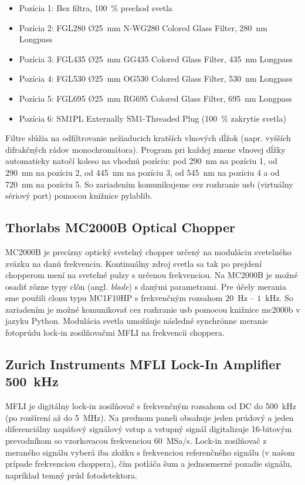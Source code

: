 \documentclass[12pt,a4paper]{article}
\begin{document}
\begin{itemize}
    \item Pozícia 1: Bez filtra, 100~\% prechod svetla
    \item Pozícia 2: FGL280 \O25~mm N-WG280 Colored Glass Filter, 280~nm Longpass
    \item Pozícia 3: FGL435 \O25~mm GG435 Colored Glass Filter, 435~nm Longpass
    \item Pozícia 4: FGL530 \O25~mm OG530 Colored Glass Filter, 530~nm Longpass
    \item Pozícia 5: FGL695 \O25~mm RG695 Colored Glass Filter, 695~nm Longpass
    \item Pozícia 6: SM1PL Externally SM1-Threaded Plug (100~\% zakrytie svetla)
\end{itemize}

Filtre slúžia na odfiltrovanie nežiaducich kratších vlnových dĺžok (napr. vyšších difrakčných rádov monochromátora). Program pri každej zmene vlnovej dĺžky automaticky natočí koleso na vhodnú pozíciu: pod 290~nm na pozíciu 1, od 290~nm na pozíciu 2, od 445~nm na pozíciu 3, od 545~nm na pozíciu 4 a od 720~nm na pozíciu 5. So zariadením komunikujeme cez rozhranie \ac{usb} (virtuálny sériový port) pomocou knižnice pylablib.

\newpage
\subsection{Thorlabs MC2000B Optical Chopper}
MC2000B je precízny optický svetelný chopper určený na moduláciu svetelného zväzku na danú frekvenciu. Kontinuálny zdroj svetla sa tak po prejdení chopperom mení na svetelné pulzy s určenou frekvenciou. Na MC2000B je možné osadiť rôzne typy clôn (angl. \textit{blade}) s danými parametrami. Pre účely merania sme použili clonu typu MC1F10HP s frekvenčným rozsahom $20$~Hz -- $1$~kHz. So zariadením je možné komunikovať cez rozhranie \ac{usb} pomocou knižnice mc2000b v jazyku Python. Modulácia svetla umožňuje následné synchrónne meranie fotoprúdu lock-in zosilňovačmi MFLI na frekvencii choppera.

\subsection{Zurich Instruments MFLI Lock-In Amplifier 500~kHz}
MFLI je digitálny lock-in zosilňovač s frekvenčným rozsahom od DC do 500~kHz (po rozšírení až do 5~MHz). Na prednom paneli obsahuje jeden prúdový a jeden diferenciálny napäťový signálový vstup a vstupný signál digitalizuje 16-bitovým prevodníkom so vzorkovacou frekvenciou 60~MSa/s. Lock-in zosilňovač z meraného signálu vyberá iba zložku s frekvenciou referenčného signálu (v našom prípade frekvenciou choppera), čím potláča šum a jednosmerné pozadie signálu, napríklad temný prúd fotodetektora.
\end{document}
